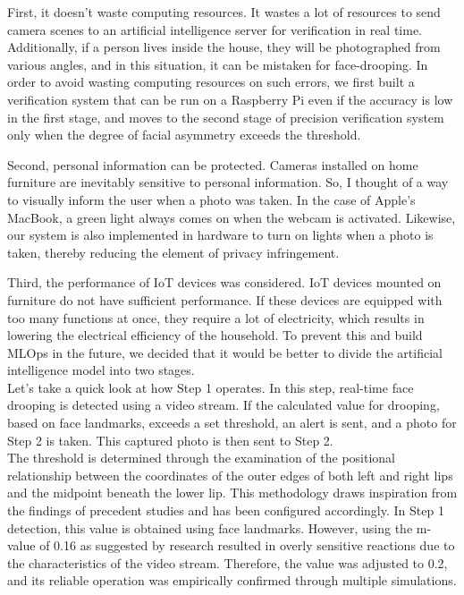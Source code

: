 First, it doesn't waste computing resources. It wastes a lot of resources to send camera scenes to an artificial intelligence server for verification in real time. Additionally, if a person lives inside the house, they will be photographed from various angles, and in this situation, it can be mistaken for face-drooping. In order to avoid wasting computing resources on such errors, we first built a verification system that can be run on a Raspberry Pi even if the accuracy is low in the first stage, and moves to the second stage of precision verification system only when the degree of facial asymmetry exceeds the threshold.

Second, personal information can be protected. Cameras installed on home furniture are inevitably sensitive to personal information. So, I thought of a way to visually inform the user when a photo was taken. In the case of Apple's MacBook, a green light always comes on when the webcam is activated. Likewise, our system is also implemented in hardware to turn on lights when a photo is taken, thereby reducing the element of privacy infringement.

Third, the performance of IoT devices was considered. IoT devices mounted on furniture do not have sufficient performance. If these devices are equipped with too many functions at once, they require a lot of electricity, which results in lowering the electrical efficiency of the household. To prevent this and build MLOps in the future, we decided that it would be better to divide the artificial intelligence model into two stages.\\  


Let's take a quick look at how Step 1 operates. In this step, real-time face drooping is detected using a video stream. If the calculated value for drooping, based on face landmarks, exceeds a set threshold, an alert is sent, and a photo for Step 2 is taken. This captured photo is then sent to Step 2.\\
The threshold is determined through \cite{mvalue}the examination of the positional relationship between the coordinates of the outer edges of both left and right lips and the midpoint beneath the lower lip. This methodology draws inspiration from the findings of precedent studies and has been configured accordingly. In Step 1 detection, this value is obtained using face landmarks. However, using the m-value of 0.16 as suggested by research resulted in overly sensitive reactions due to the characteristics of the video stream. Therefore, the value was adjusted to 0.2, and its reliable operation was empirically confirmed through multiple simulations.


